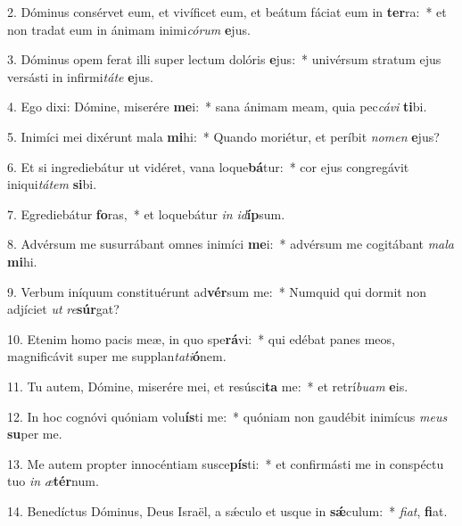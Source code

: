 2. Dóminus consérvet eum, et vivíficet eum, et beátum fáciat eum in \textbf{ter}ra:~*  et non tradat eum in ánimam inimi\textit{có}\textit{rum} \textbf{e}jus.\

3. Dóminus opem ferat illi super lectum dolóris \textbf{e}jus:~*  univérsum stratum ejus versásti in infirmi\textit{tá}\textit{te} \textbf{e}jus.\

4. Ego dixi: Dómine, miserére \textbf{me}i:~*  sana ánimam meam, quia pec\textit{cá}\textit{vi} \textbf{ti}bi.\

5. Inimíci mei dixérunt mala \textbf{mi}hi:~*  Quando moriétur, et períbit \textit{no}\textit{men} \textbf{e}jus?\

6. Et si ingrediebátur ut vidéret, vana loque\textbf{bá}tur:~*  cor ejus congregávit iniqui\textit{tá}\textit{tem} \textbf{si}bi.\

7. Egrediebátur \textbf{fo}ras,~*  et loquebátur \textit{in} \textit{id}\textbf{íp}sum.\

8. Advérsum me susurrábant omnes inimíci \textbf{me}i:~*  advérsum me cogitábant \textit{ma}\textit{la} \textbf{mi}hi.\

9. Verbum iníquum constituérunt ad\textbf{vér}sum me:~*  Numquid qui dormit non adjíciet \textit{ut} \textit{re}\textbf{súr}gat?\

10. Etenim homo pacis meæ, in quo spe\textbf{rá}vi:~*  qui edébat panes meos, magnificávit super me supplan\textit{ta}\textit{ti}\textbf{ó}nem.\

11. Tu autem, Dómine, miserére mei, et resúsci\textbf{ta} me:~*  et retrí\textit{bu}\textit{am} \textbf{e}is.\

12. In hoc cognóvi quóniam volu\textbf{ís}ti me:~*  quóniam non gaudébit inimícus \textit{me}\textit{us} \textbf{su}per me.\

13. Me autem propter innocéntiam susce\textbf{pís}ti:~*  et confirmásti me in conspéctu tuo \textit{in} \textit{æ}\textbf{tér}num.\

14. Benedíctus Dóminus, Deus Israël, a sǽculo et usque in \textbf{sǽ}culum:~*  \textit{fi}\textit{at}, \textbf{fi}at.\

